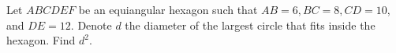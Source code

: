 Let $ABCDEF$ be an equiangular hexagon such that $AB=6, BC=8, CD=10$, and $DE=12$. Denote $d$ the diameter of the largest circle that fits inside the hexagon. Find $d^2$.